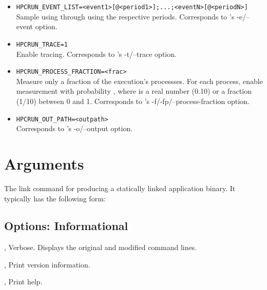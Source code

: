 \documentclass[english]{article}
\begin{document}
\begin{itemize}
\item \verb+HPCRUN_EVENT_LIST=<event1>[@<period1>];...;<eventN>[@<periodN>]+\\
  Sample using  through  using the respective periods.
  Corresponds to 's -e/--event option.

\item \verb+HPCRUN_TRACE=1+\\
  Enable tracing.
  Corresponds to 's -t/--trace option.

\item \verb+HPCRUN_PROCESS_FRACTION=<frac>+\\
  Measure only a fraction  of the execution's processses.
  For each process, enable measurement with probability , where  is a real number (0.10) or a fraction (1/10) between 0 and 1.
  Corresponds to 's -f/-fp/--process-fraction option.

\item \verb+HPCRUN_OUT_PATH=<outpath>+\\
  Corresponds to 's -o/--output option.

\end{itemize}




\section{Arguments}

\begin{Description}
\item[\Arg{link-command}] The link command for producing a statically linked application binary.
It typically has the following form:\\
\SP\SP\SP {}   
\end{Description}


\subsection{Options: Informational}

\begin{Description}
\item[\Opt{-v}, \Opt{--verbose}]
Verbose. Displays the original and modified command lines.

\item[\Opt{-V}, \Opt{--version}]
Print version information.

\item[\Opt{-h}, \Opt{--help}]
Print help.
\end{Description}
\end{document}
